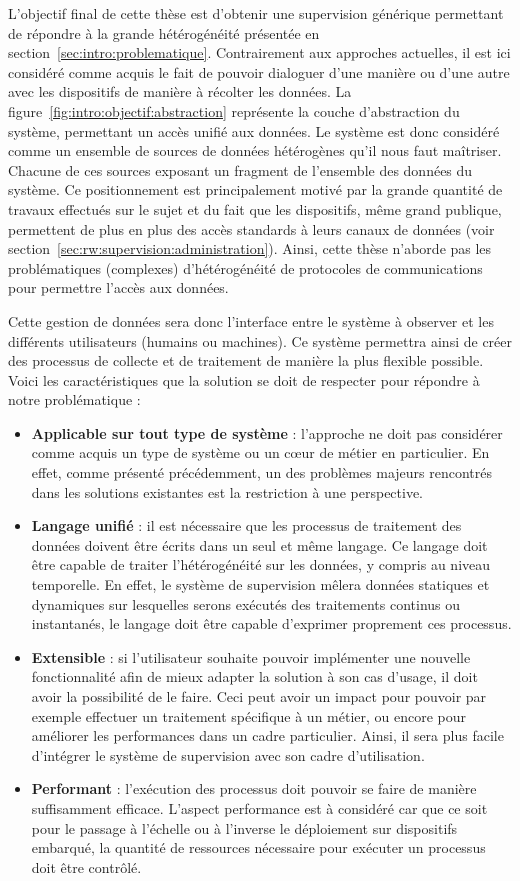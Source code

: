 L'objectif final de cette thèse est d'obtenir une supervision générique permettant de répondre à la grande hétérogénéité présentée en section~\ref{sec:intro:problematique}. Contrairement aux approches actuelles, il est ici considéré comme acquis le fait de pouvoir dialoguer d'une manière ou d'une autre avec les dispositifs de manière à récolter les données. La figure~\ref{fig:intro:objectif:abstraction} représente la couche d'abstraction du système, permettant un accès unifié aux données. Le système est donc considéré comme un ensemble de sources de données hétérogènes qu'il nous faut maîtriser. Chacune de ces sources exposant un fragment de l'ensemble des données du système. Ce positionnement est principalement motivé par la grande quantité de travaux effectués sur le sujet et du fait que les dispositifs, même grand publique, permettent de plus en plus des accès standards à leurs canaux de données (voir section~\ref{sec:rw:supervision:administration}). Ainsi, cette thèse n'aborde pas les problématiques (complexes) d'hétérogénéité de protocoles de communications pour permettre l'accès aux données.

Cette gestion de données sera donc l'interface entre le système à observer et les différents utilisateurs (humains ou machines). Ce système permettra ainsi de créer des processus de collecte et de traitement de manière la plus flexible possible. Voici les caractéristiques que la solution se doit de respecter pour répondre à notre problématique :
\begin{itemize}
    \item \textbf{Applicable sur tout type de système} : l'approche ne doit pas considérer comme acquis un type de système ou un cœur de métier en particulier. En effet, comme présenté précédemment, un des problèmes majeurs rencontrés dans les solutions existantes est la restriction à une perspective.
    \item \textbf{Langage unifié} : il est nécessaire que les processus de traitement des données doivent être écrits dans un seul et même langage. Ce langage doit être capable de traiter l'hétérogénéité sur les données, y compris au niveau temporelle. En effet, le système de supervision mêlera données statiques et dynamiques sur lesquelles serons exécutés des traitements continus ou instantanés, le langage doit être capable d'exprimer proprement ces processus.
    \item \textbf{Extensible} : si l'utilisateur souhaite pouvoir implémenter une nouvelle fonctionnalité afin de mieux adapter la solution à son cas d'usage, il doit avoir la possibilité de le faire. Ceci peut avoir un impact pour pouvoir par exemple effectuer un traitement spécifique à un métier, ou encore pour améliorer les performances dans un cadre particulier. Ainsi, il sera plus facile d'intégrer le système de supervision avec son cadre d'utilisation.
    \item \textbf{Performant} : l'exécution des processus doit pouvoir se faire de manière suffisamment efficace. L'aspect performance est à considéré car que ce soit pour le passage à l'échelle ou à l'inverse le déploiement sur dispositifs embarqué, la quantité de ressources nécessaire pour exécuter un processus doit être contrôlé.
\end{itemize}
